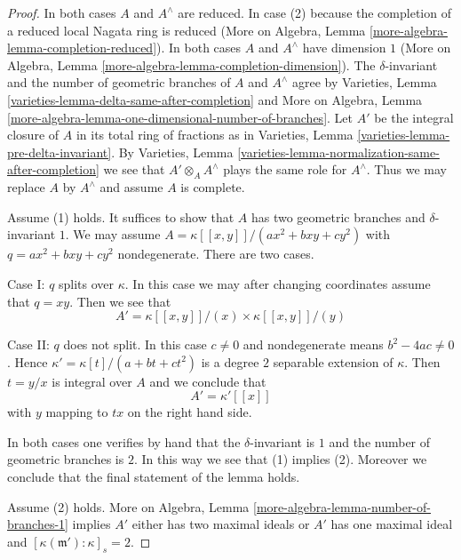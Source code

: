 \documentclass{stacks-project}
\theoremstyle{plain}
\theoremstyle{definition}
\theoremstyle{remark}
\numberwithin{equation}{subsection}
\begin{document}
\begin{proof}
In both cases $A$ and $A^\wedge$ are reduced. In case (2)
because the completion of a reduced local Nagata ring is reduced
(More on Algebra, Lemma \ref{more-algebra-lemma-completion-reduced}).
In both cases $A$ and $A^\wedge$ have dimension $1$
(More on Algebra, Lemma \ref{more-algebra-lemma-completion-dimension}).
The $\delta$-invariant and the number of geometric branches of
$A$ and $A^\wedge$ agree by
Varieties, Lemma \ref{varieties-lemma-delta-same-after-completion}
and
More on Algebra, Lemma
\ref{more-algebra-lemma-one-dimensional-number-of-branches}.
Let $A'$ be the integral closure of $A$ in its total ring of fractions
as in Varieties, Lemma \ref{varieties-lemma-pre-delta-invariant}.
By Varieties, Lemma \ref{varieties-lemma-normalization-same-after-completion}
we see that $A' \otimes_A A^\wedge$ plays the same role for $A^\wedge$.
Thus we may replace $A$ by $A^\wedge$ and assume $A$ is complete.

\medskip\noindent
Assume (1) holds. It suffices to show that $A$ has two
geometric branches and $\delta$-invariant $1$.
We may assume $A = \kappa[[x, y]]/(ax^2 + bxy + cy^2)$ with
$q = ax^2 + bxy + cy^2$ nondegenerate. There are two cases.

\medskip\noindent
Case I: $q$ splits over $\kappa$. In this case we may after
changing coordinates assume that $q = xy$. Then we see that
$$
A' = \kappa[[x, y]]/(x) \times \kappa[[x, y]]/(y)
$$

\medskip\noindent
Case II: $q$ does not split. In this case $c \not = 0$ and
nondegenerate means $b^2 - 4ac \not = 0$. Hence
$\kappa' = \kappa[t]/(a + bt + ct^2)$ is a degree $2$
separable extension of $\kappa$. Then $t = y/x$
is integral over $A$ and we conclude that
$$
A' = \kappa'[[x]]
$$
with $y$ mapping to $tx$ on the right hand side.

\medskip\noindent
In both cases one verifies by hand that the $\delta$-invariant
is $1$ and the number of geometric branches is $2$. In
this way we see that (1) implies (2).
Moreover we conclude that the final statement of the lemma holds.

\medskip\noindent
Assume (2) holds. 
More on Algebra, Lemma \ref{more-algebra-lemma-number-of-branches-1}
implies $A'$ either has two maximal ideals or $A'$ has one maximal ideal
and $[\kappa(\mathfrak m') : \kappa]_s = 2$.


\end{proof}
\end{document}

